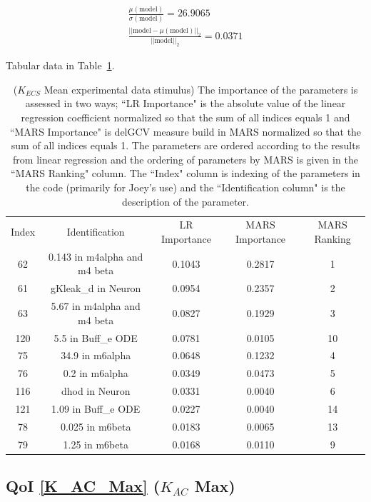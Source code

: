 \documentclass[12pt]{article}
\numberwithin{equation}{section}
\begin{document}
\begin{eqnarray*}
\frac{\mu(\text{model})}{\sigma(\text{model})} = 26.9065\\
\frac{\vert \vert \text{model}-\mu(\text{model}) \vert \vert_2 }{\vert \vert \text{model}\vert \vert_2 } = 0.0371
\end{eqnarray*}

Tabular data in Table~\ref{qoi_K_ECS_Mean_ex}.


\begin{table}[h]
\centering
\begin{tabular}{ccccc}
Index & Identification & LR Importance & MARS Importance & MARS Ranking \\
62 & 0.143 in m4alpha and m4 beta &  0.1043 & 0.2817 & 1\\
61 & gKleak\_d in Neuron & 0.0954 & 0.2357 &  2\\
63 &   5.67 in m4alpha and m4 beta & 0.0827 & 0.1929 & 3\\
120 & 5.5 in Buff\_e ODE & 0.0781 & 0.0105 & 10\\
75 & 34.9 in m6alpha & 0.0648 & 0.1232 & 4\\
76 & 0.2 in m6alpha & 0.0349 & 0.0473 & 5\\
116 & dhod in Neuron & 0.0331 & 0.0040 & 6\\
121 & 1.09 in Buff\_e ODE & 0.0227 & 0.0040 & 14\\
78 & 0.025 in m6beta & 0.0183 &  0.0065 & 13\\
79 & 1.25 in m6beta & 0.0168 & 0.0110 & 9\\
\end{tabular}
\caption{($K_{ECS}$ Mean experimental data stimulus) The importance of the parameters is assessed in two ways; ``LR Importance" is the absolute value of the linear regression coefficient normalized so that the sum of all indices equals 1 and ``MARS Importance" is delGCV measure build in MARS normalized so that the sum of all indices equals 1. The parameters are ordered according to the results from linear regression and the ordering of parameters by MARS is given in the ``MARS Ranking" column. The ``Index" column is indexing of the parameters in the code (primarily for Joey's use) and the ``Identification column" is the description of the parameter.}
\label{qoi_K_ECS_Mean_ex}
\end{table}

\newpage
\subsection{QoI \eqref{K_AC_Max} ($K_{AC}$ Max)}
\end{document}
